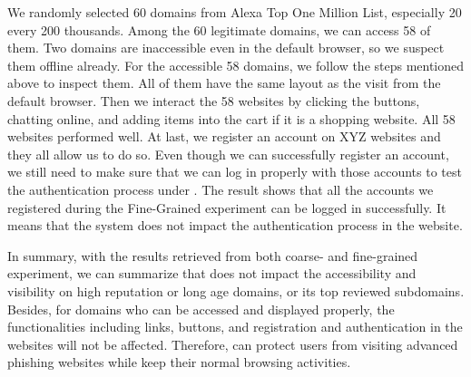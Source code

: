 We randomly selected 60 domains from Alexa Top One Million List, especially 20 every 200 thousands.
Among the 60 legitimate domains, we can access 58 of them.
Two domains are inaccessible even in the default browser, so we suspect them offline already.
For the accessible 58 domains,
we follow the steps mentioned above to inspect them.
All of them have the same layout as the visit from the default browser.
Then we interact the 58 websites by clicking the buttons, chatting online, and adding items into the cart if it is a shopping website.
All 58 websites performed well.
At last, we register an account on XYZ websites and they all allow us to do so.
Even though we can successfully register an account, we still need to make sure that we can log in properly with those accounts to test the authentication process under \spartacus.
The result shows that all the accounts we registered during the Fine-Grained experiment can be logged in successfully.
It means that the \spartacus system does not impact the authentication process in the website.

In summary, with the results retrieved from both coarse- and fine-grained experiment, we can summarize that \spartacus does not impact the accessibility and visibility on high reputation or long age domains, or its top reviewed subdomains.
Besides, for domains who can be accessed and displayed properly, the functionalities including links, buttons, and registration and authentication in the websites will not be affected.
Therefore, \spartacus can protect users from visiting advanced phishing websites while keep their normal browsing activities.





